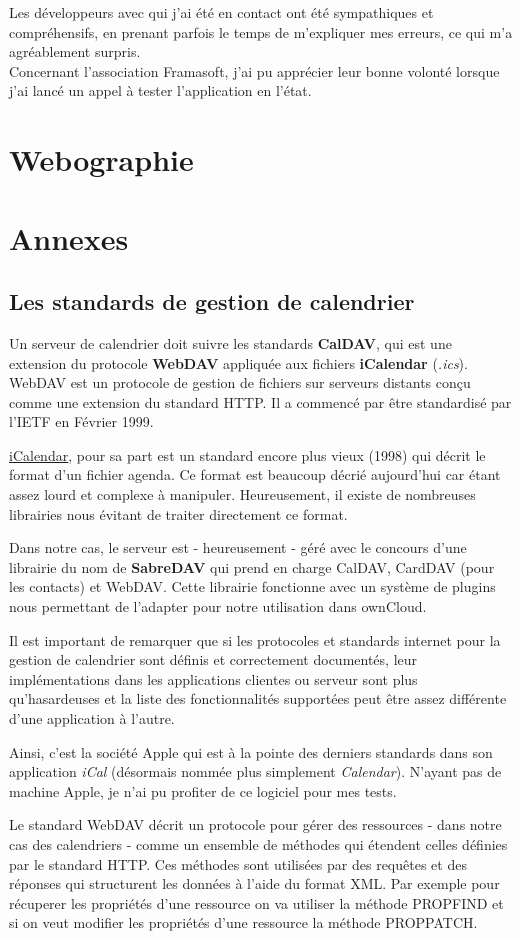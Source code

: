 \documentclass[10pt,a4paper, twoside]{report}
\newcommand{\mychapter}[2]{
	\setcounter{chapter}{#1}
	\setcounter{section}{0}
	\chapter*{#2}
	\addcontentsline{toc}{chapter}{#2}
}
\begin{document}
	Les développeurs avec qui j'ai été en contact ont été sympathiques et compréhensifs, en prenant parfois le temps de m'expliquer mes erreurs, ce qui m'a agréablement surpris.
	\\
	
	Concernant l'association Framasoft, j'ai pu apprécier leur bonne volonté lorsque j'ai lancé un appel à tester l'application en l'état.
	
	\mychapter{8}{Webographie}
	\mychapter{9}{Annexes}
	\label{ch:Annexes}
	\section{Les standards de gestion de calendrier}
	\label{sec:standards}
	Un serveur de calendrier doit suivre les standards \textbf{CalDAV}, qui est une extension du protocole \textbf{WebDAV} appliquée aux fichiers \textbf{iCalendar} (\textit{.ics}). WebDAV est un protocole de gestion de fichiers sur serveurs distants conçu comme une extension du standard HTTP. Il a commencé par être standardisé par l'IETF en Février 1999.
	
	\href{https://tools.ietf.org/html/rfc2445}{iCalendar}, pour sa part est un standard encore plus vieux (1998) qui décrit le format d'un fichier agenda. Ce format est beaucoup décrié aujourd'hui car étant assez lourd et complexe à manipuler. Heureusement, il existe de nombreuses librairies nous évitant de traiter directement ce format.
	
	Dans notre cas, le serveur est - heureusement - géré avec le concours d'une librairie du nom de \textbf{SabreDAV} qui prend en charge CalDAV, CardDAV (pour les contacts) et WebDAV. Cette librairie fonctionne avec un système de plugins nous permettant de l'adapter pour notre utilisation dans ownCloud.
	
	Il est important de remarquer que si les protocoles et standards internet pour la gestion de calendrier sont définis et correctement documentés, leur implémentations dans les applications clientes ou serveur sont plus qu'hasardeuses et la liste des fonctionnalités supportées peut être assez différente d'une application à l'autre.
	
	Ainsi, c'est la société Apple qui est à la pointe des derniers standards dans son application \textit{iCal} (désormais nommée plus simplement \textit{Calendar}). N'ayant pas de machine Apple, je n'ai pu profiter de ce logiciel pour mes tests.
	
	Le standard WebDAV décrit un protocole pour gérer des ressources - dans notre cas des calendriers - comme un ensemble de méthodes qui étendent celles définies par le standard HTTP. Ces méthodes sont utilisées par des requêtes et des réponses qui structurent les données à l'aide du format XML. Par exemple pour récuperer les propriétés d'une ressource on va utiliser la méthode PROPFIND et si on veut modifier les propriétés d'une ressource la méthode PROPPATCH.
	
\end{document}
